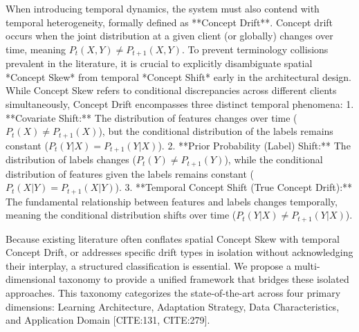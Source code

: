 \documentclass[journal]{IEEEtran}
\begin{document}
When introducing temporal dynamics, the system must also contend with temporal heterogeneity, formally defined as **Concept Drift**. Concept drift occurs when the joint distribution at a given client (or globally) changes over time, meaning $P_t(X, Y) \neq P_{t+1}(X, Y)$. To prevent terminology collisions prevalent in the literature, it is crucial to explicitly disambiguate spatial *Concept Skew* from temporal *Concept Shift* early in the architectural design. While Concept Skew refers to conditional discrepancies across different clients simultaneously, Concept Drift encompasses three distinct temporal phenomena:
1.  **Covariate Shift:** The distribution of features changes over time ($P_t(X) \neq P_{t+1}(X)$), but the conditional distribution of the labels remains constant ($P_t(Y|X) = P_{t+1}(Y|X)$).
2.  **Prior Probability (Label) Shift:** The distribution of labels changes ($P_t(Y) \neq P_{t+1}(Y)$), while the conditional distribution of features given the labels remains constant ($P_t(X|Y) = P_{t+1}(X|Y)$).
3.  **Temporal Concept Shift (True Concept Drift):** The fundamental relationship between features and labels changes temporally, meaning the conditional distribution shifts over time ($P_t(Y|X) \neq P_{t+1}(Y|X)$).

Because existing literature often conflates spatial Concept Skew with temporal Concept Drift, or addresses specific drift types in isolation without acknowledging their interplay, a structured classification is essential. We propose a multi-dimensional taxonomy to provide a unified framework that bridges these isolated approaches. This taxonomy categorizes the state-of-the-art across four primary dimensions: Learning Architecture, Adaptation Strategy, Data Characteristics, and Application Domain [CITE:131, CITE:279].
\end{document}
